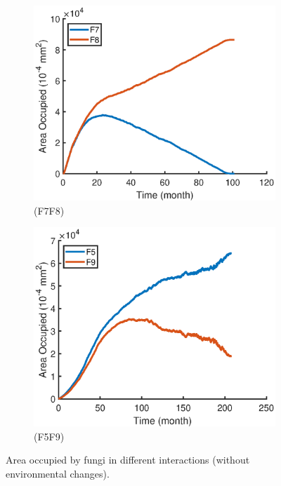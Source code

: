 \documentclass[a4paper,12pt]{article}
\begin{document}
\begin{figure}[H]
\begin{subfigure}{0.4\textwidth}
	\includegraphics[width=\textwidth]{./4/noE_F7F8_area_2.eps}
	\caption{(F7F8)}
	\label{noE_F7F8_area}
\end{subfigure}
\begin{subfigure}{0.4\textwidth}
	\includegraphics[width=\textwidth]{./4/noE_F5F9_area.eps}
	\caption{(F5F9)}
	\label{noE_F5F9_area}
\end{subfigure}
\caption{Area occupied by fungi in different interactions (without environmental changes).}
\label{noE_area}
\end{figure}
\end{document}
